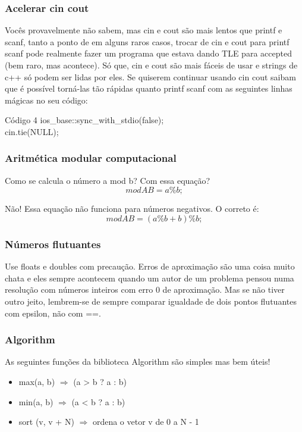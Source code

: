 \documentclass{beamer}
\begin{document}
	\begin{frame}
	\frametitle{Acelerar cin cout}
	Vocês provavelmente não sabem, mas cin e cout são mais lentos que printf e scanf,
	tanto a ponto de em alguns raros casos, trocar de cin e cout para printf scanf pode
	realmente fazer um programa que estava dando TLE para accepted (bem raro, mas
	acontece).
	Só que, cin e cout são mais fáceis de usar e strings de c++ só podem ser lidas
	por eles. Se quiserem continuar usando cin cout saibam que é possível torná-las
	tão rápidas quanto printf scanf com as seguintes linhas mágicas no seu código:
	\begin{block}{Código 4}
		\hspace{10 pt} ios\_base::sync\_with\_stdio(false);\\
		\hspace{10 pt} cin.tie(NULL);\\
	\end{block}
	\end{frame}
	\begin{frame}
	\frametitle{Aritmética modular computacional}
	Como se calcula o número a mod b? Com essa equação?
	\begin{equation}
		modAB = a\%b; \nonumber
	\end{equation} \par
	Não! Essa equação não funciona para números negativos. O correto é:
	\begin{equation}
		modAB = (a\%b + b)\%b; \nonumber
	\end{equation}
	\end{frame}
	\begin{frame}
	\frametitle{Números flutuantes}
		Use floats e doubles com precaução. Erros de aproximação são uma coisa
		muito chata e eles sempre acontecem quando um autor de um problema pensou
		numa resolução com números inteiros com erro 0 de aproximação. Mas se não tiver
		outro jeito, lembrem-se de sempre comparar igualdade de dois pontos flutuantes
		com epsilon, não com ==.
	\end{frame}
	\begin{frame}
	\frametitle{Algorithm}
		As seguintes funções da biblioteca Algorithm são simples mas bem úteis!
		\begin{itemize}
			\item max(a, b) $\Rightarrow$ (a > b ? a : b)
			\item min(a, b) $\Rightarrow$ (a < b ? a : b)
			\item sort (v, v + N) $\Rightarrow$ ordena o vetor v de 0 a N - 1
		\end{itemize}
	\end{frame}
\end{document}
